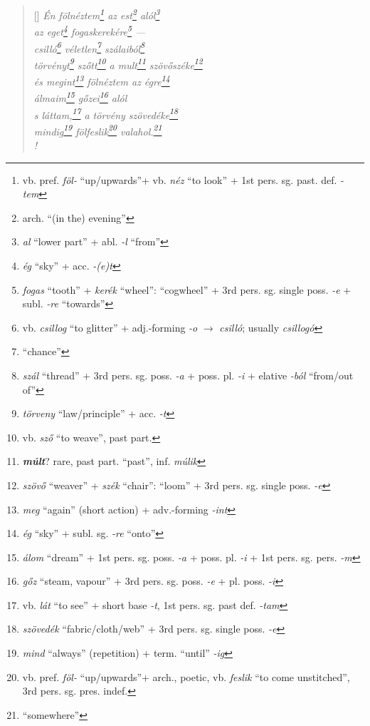 \documentclass[a4paper,12pt,twoside,final]{book}
\begin{document}
\begin{verse}[\versewidth]
  \it
  Én fölnéztem\footnote{vb. pref. \emph{föl-} ``up/upwards''+ vb.
  \emph{néz} ``to look'' + 1st pers. sg. past. def. \emph{-tem}} az
  est\footnote{arch. ``(in the) evening''} alól\footnote{\emph{al}
  ``lower part'' + abl. \emph{-l} ``from''} \\
  az eget\footnote{\emph{ég} ``sky'' + acc. \emph{-(e)t}}
  fogaskerekére\footnote{\emph{fogas} ``tooth'' +
  \emph{kerék} ``wheel'': ``cogwheel'' + 3rd pers. sg. single
  poss. \emph{-e} + subl. \emph{-re} ``towards''} --- \\
  csilló\footnote{vb. \emph{csillog} ``to glitter'' +
  adj.-forming \emph{-o} $\rightarrow$
  \emph{csilló}; usually \emph{csillogó}}
  véletlen\footnote{``chance''} szálaiból\footnote{\emph{szál}
  ``thread'' + 3rd pers. sg. poss. \emph{-a} + poss. pl. \emph{-i} +
  elative \emph{-ból} ``from/out of''} \\
  törvényt\footnote{\emph{törveny} ``law/principle'' + acc. \emph{-t}}
  szőtt\footnote{vb. \emph{sző} ``to weave'', past part.} a
  mult\footnote{\textbf{\emph{múlt}}? rare, past part. ``past'',
  inf. \emph{múlik}}
  szövőszéke\footnote{\emph{szövő} ``weaver'' + \emph{szék} ``chair'':
  ``loom'' + 3rd pers. sg. single poss. \emph{-e}} \\
  és megint\footnote{\emph{meg} ``again'' (short action) +
  adv.-forming \emph{-int}} fölnéztem az égre\footnote{\emph{ég}
  ``sky'' + subl. sg. \emph{-re} ``onto''} \\
  álmaim\footnote{\emph{álom} ``dream'' +
  1st pers. sg. poss. \emph{-a} + poss. pl. \emph{-i} + 1st
  pers. sg. pers. \emph{-m}} gőzei\footnote{\emph{gőz} ``steam,
  vapour'' + 3rd pers. sg. poss. \emph{-e} + pl. poss. \emph{-i}} alól \\
  s láttam,\footnote{vb. \emph{lát} ``to see'' +
  short base \emph{-t}, 1st pers. sg. past def. \emph{-tam}} a törvény
  szövedéke\footnote{\emph{szövedék} ``fabric/cloth/web'' + 3rd
  pers. sg. single poss. \emph{-e}} \\
  mindig\footnote{\emph{mind} ``always'' (repetition) + term. ``until''
  \emph{-ig}} fölfeslik\footnote{vb. pref. \emph{föl-} ``up/upwards''+
  arch., poetic, vb.
  \emph{feslik} ``to come unstitched'', 3rd pers. sg. pres. indef.}
  valahol.\footnote{``somewhere''} \\!
\end{verse}

\newpage

\end{document}
